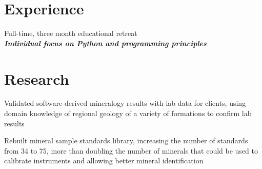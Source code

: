 \documentclass[letterpaper]{deedy-resume} %
\begin{document}
\hfill
%
%
\begin{minipage}[t]{0.66\textwidth} %


\section{Experience}


\vspace{\topsep} %
\begin{tightitemize}
\item Full-time, three month educational retreat \\
{\footnotesize \textit{\textbf{Individual focus on Python and programming principles }}} \\
\end{tightitemize}

\sectionspace %

\section{Research}


\begin{tightitemize}
\item Validated software-derived mineralogy results with lab data for clients, using domain knowledge of regional geology of a variety of formations to confirm lab results
\item Rebuilt mineral sample standards library, increasing the number of standards from 34 to 75, more than doubling the number of minerals that could be used to calibrate instruments and allowing better mineral identification
\end{tightitemize}


\end{minipage}
\end{document}
